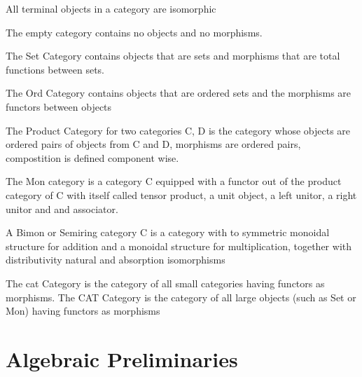         \begin{remark}
         All terminal objects in a category are isomorphic
        \end{remark}

        
        \begin{example}
         The empty category contains no objects and no morphisms. 
         
         The Set Category contains objects that are sets and morphisms that are total functions between sets. 
         
        The Ord Category contains objects that are ordered sets and the morphisms are functors between objects
         
         The Product Category for two categories C, D is the category whose objects are ordered pairs of objects from C and D, morphisms are ordered pairs, compostition is defined component wise. 
         
         The Mon category is a category C equipped with a functor out of the product category of C with itself called tensor product, a unit object, a left unitor, a right unitor and and associator. 
         
         A Bimon or Semiring category C is a category with to symmetric monoidal structure for addition and a monoidal structure for multiplication, together with distributivity natural and absorption isomorphisms
         
         The cat Category is the category of all small categories having functors as morphisms. The CAT Category is the category of all large objects (such as Set or Mon) having functors as morphisms
        \end{example}

        
    \section{Algebraic Preliminaries}
        \begin{definition}
            
        \end{definition}

        \begin{definition}[Monoid]
         
        \end{definition}
        
        \begin{definition}
         
        \end{definition}
        
